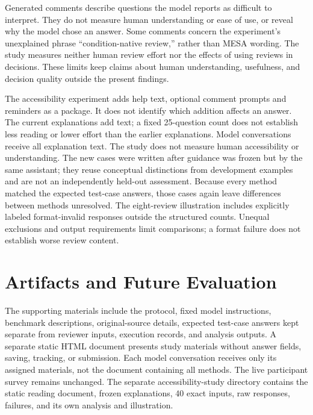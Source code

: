 \documentclass[10pt,conference]{IEEEtran}
\begin{document}
Generated comments describe questions the model reports as difficult to interpret. They do not measure human understanding or ease of use, or reveal why the model chose an answer. Some comments concern the experiment's unexplained phrase ``condition-native review,'' rather than MESA wording. The study measures neither human review effort nor the effects of using reviews in decisions. These limits keep claims about human understanding, usefulness, and decision quality outside the present findings.

The accessibility experiment adds help text, optional comment prompts and reminders as a package. It does not identify which addition affects an answer. The current explanations add text; a fixed 25-question count does not establish less reading or lower effort than the earlier explanations. Model conversations receive all explanation text. The study does not measure human accessibility or understanding. The new cases were written after guidance was frozen but by the same assistant; they reuse conceptual distinctions from development examples and are not an independently held-out assessment. Because every method matched the expected test-case answers, those cases again leave differences between methods unresolved. The eight-review illustration includes explicitly labeled format-invalid responses outside the structured counts. Unequal exclusions and output requirements limit comparisons; a format failure does not establish worse review content.

\section{Artifacts and Future Evaluation}
The supporting materials include the protocol, fixed model instructions, benchmark descriptions, original-source details, expected test-case answers kept separate from reviewer inputs, execution records, and analysis outputs. A separate static HTML document presents study materials without answer fields, saving, tracking, or submission. Each model conversation receives only its assigned materials, not the document containing all methods. The live participant survey remains unchanged. The separate accessibility-study directory contains the static reading document, frozen explanations, 40 exact inputs, raw responses, failures, and its own analysis and illustration.
\end{document}
